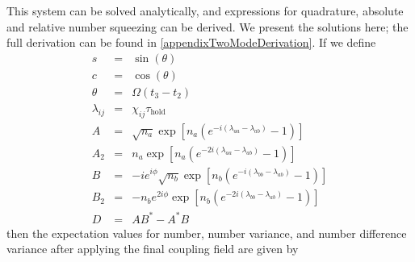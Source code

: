 \documentclass{iopart}
\begin{document}
This system can be solved analytically, and expressions for quadrature, absolute and relative number squeezing can be derived. We present the solutions here; the full derivation can be found in \ref{appendixTwoModeDerivation}.
If we define
\begin{eqnarray}
s &=& \sin(\theta) \label{eqsDef} \\
c &=& \cos(\theta) \\
\theta &=& \Omega(t_3 - t_2) \\
\lambda_{ij} &=& \chi_{ij} \tau_{\mathrm{hold}} \\
A &=& \sqrt{n_a} \exp [n_a (e^{-i(\lambda_{aa}-\lambda_{ab})} - 1 )] \\
A_2 &=& n_a \exp [n_a (e^{-2i(\lambda_{aa}-\lambda_{ab})} - 1 )] \\
B &=& -i e^{i \phi}\sqrt{n_b} \exp [n_b (e^{-i(\lambda_{bb}-\lambda_{ab})} - 1 )] \\
B_2 &=& -n_b e^{2i\phi} \exp [n_b (e^{-2i(\lambda_{bb}-\lambda_{ab})} - 1 )] \\
D &=& AB^* - A^*B \label{eqDDef}
\end{eqnarray}
then the expectation values for number, number variance, and number difference variance after applying the final coupling field are given by
\end{document}
